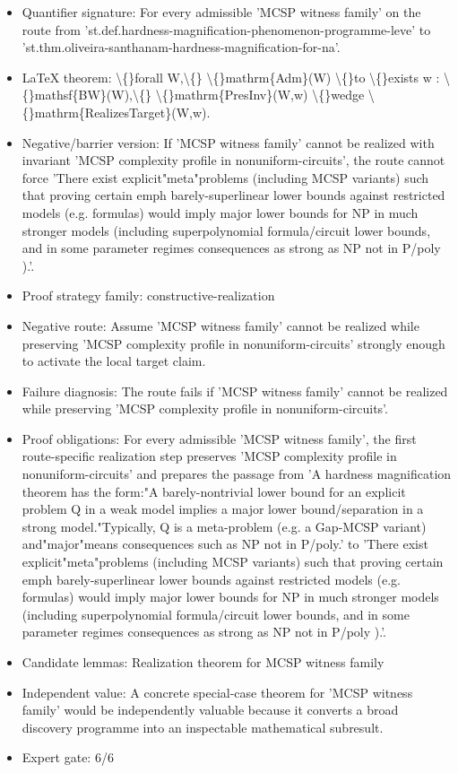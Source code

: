 \documentclass[11pt]{article}
\begin{document}
\begin{itemize}
\item Quantifier signature: For every admissible 'MCSP witness family' on the route from 'st.def.hardness-magnification-phenomenon-programme-leve' to 'st.thm.oliveira-santhanam-hardness-magnification-for-na'.
\item LaTeX theorem: \textbackslash\{\}forall W,\textbackslash\{\} \textbackslash\{\}mathrm\{Adm\}(W) \textbackslash\{\}to \textbackslash\{\}exists w : \textbackslash\{\}mathsf\{BW\}(W),\textbackslash\{\} \textbackslash\{\}mathrm\{PresInv\}(W,w) \textbackslash\{\}wedge \textbackslash\{\}mathrm\{RealizesTarget\}(W,w).
\item Negative/barrier version: If 'MCSP witness family' cannot be realized with invariant 'MCSP complexity profile in nonuniform-circuits', the route cannot force 'There exist explicit"meta"problems (including MCSP variants) such that proving certain emph barely-superlinear lower bounds against restricted models (e.g. formulas) would imply major lower bounds for NP in much stronger models (including superpolynomial formula/circuit lower bounds, and in some parameter regimes consequences as strong as NP not in P/poly ).'.
\item Proof strategy family: constructive-realization
\item Negative route: Assume 'MCSP witness family' cannot be realized while preserving 'MCSP complexity profile in nonuniform-circuits' strongly enough to activate the local target claim.
\item Failure diagnosis: The route fails if 'MCSP witness family' cannot be realized while preserving 'MCSP complexity profile in nonuniform-circuits'.
\item Proof obligations: For every admissible 'MCSP witness family', the first route-specific realization step preserves 'MCSP complexity profile in nonuniform-circuits' and prepares the passage from 'A hardness magnification theorem has the form:"A barely-nontrivial lower bound for an explicit problem Q in a weak model implies a major lower bound/separation in a strong model."Typically, Q is a meta-problem (e.g. a Gap-MCSP variant) and"major"means consequences such as NP not in P/poly.' to 'There exist explicit"meta"problems (including MCSP variants) such that proving certain emph barely-superlinear lower bounds against restricted models (e.g. formulas) would imply major lower bounds for NP in much stronger models (including superpolynomial formula/circuit lower bounds, and in some parameter regimes consequences as strong as NP not in P/poly ).'.
\item Candidate lemmas: Realization theorem for MCSP witness family
\item Independent value: A concrete special-case theorem for 'MCSP witness family' would be independently valuable because it converts a broad discovery programme into an inspectable mathematical subresult.
\item Expert gate: 6/6
\end{itemize}
\end{document}
